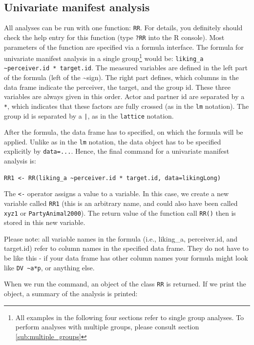 \documentclass[a4paper]{article}\usepackage[]{graphicx}\usepackage[]{color}
\begin{document}
\subsection{Univariate manifest analysis} %
\label{sub:univariate_manifest_analysis}
All analyses can be run with one function: \texttt{RR}. For details, you definitely should check the help entry for this function (type \texttt{?RR} into the R console). Most parameters of the function are specified via a formula interface. The formula for univariate manifest analysis in a single group\footnote{All examples in the following four sections refer to single group analyses. To perform analyses with multiple groups, please consult section \ref{sub:multiple_groups}} would be: \texttt{liking\_a \textasciitilde perceiver.id * target.id}. The measured variables are defined in the left part of the formula (left of the \textasciitilde sign). The right part defines, which columns in the data frame indicate the perceiver, the target, and the group id. These three variables are always given in this order. Actor and partner id are separated by a \texttt{*}, which indicates that these factors are fully crossed (as in the \texttt{lm} notation). The group id is separated by a \texttt{|}, as in the \texttt{lattice} notation.

After the formula, the data frame has to specified, on which the formula will be applied. Unlike as in the \texttt{lm} notation, the data object has to be specified explicitly by \texttt{data=...}. Hence, the final command for a univariate manifest analysis is:
\begin{center}
\texttt{RR1 <- RR(liking\_a \textasciitilde perceiver.id * target.id, data=likingLong)}
\end{center}

The \texttt{<-} operator assigns a value to a variable. In this case, we create a new variable called \texttt{RR1} (this is an arbitrary name, and could also have been called \texttt{xyz1} or \texttt{PartyAnimal2000}). The return value of the function call \texttt{RR()} then is stored in this new variable.

Please note: all variable names in the formula (i.e., liking\_a, perceiver.id, and target.id) refer to column names in the specified data frame. They do not have to be like this - if your data frame has other column names your formula might look like \texttt{DV \textasciitilde a*p}, or anything else.


When we run the command, an object of the class \texttt{RR} is returned. If we print the object, a summary of the analysis is printed:
\end{document}
